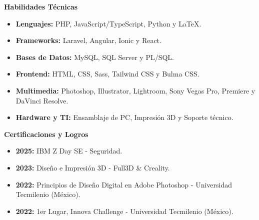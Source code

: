 \documentclass[9pt]{developercv}
\begin{document}
\begin{minipage}[t]{0.5\textwidth}
\vspace{3pt}
\textbf{Habilidades Técnicas}
\vspace{3pt}
\begin{itemize}
  \item \textbf {Lenguajes:} PHP, JavaScript/TypeScript, Python y LaTeX.
  \item \textbf {Frameworks:} Laravel, Angular, Ionic y React.
  \item \textbf {Bases de Datos:} MySQL, SQL Server y PL/SQL.
  \item \textbf {Frontend:} HTML, CSS, Sass, Tailwind CSS y Bulma CSS.
  \item \textbf {Multimedia:} Photoshop, Illustrator, Lightroom, Sony Vegas Pro, Premiere y DaVinci Resolve.
  \item \textbf {Hardware y TI:} Ensamblaje de PC, Impresión 3D y Soporte técnico.
\end{itemize}
\end{minipage}
\begin{minipage}[t]{0.5\textwidth}
\vspace{3pt}
\textbf{Certificaciones y Logros}
\begin{itemize}
  \item \textbf{2025:} IBM Z Day SE - Seguridad.
  \item \textbf{2023:} Diseño e Impresión 3D - Full3D \& Creality.
  \item \textbf{2022:} Principios de Diseño Digital en Adobe Photoshop  - Universidad Tecmilenio (México).
  \item \textbf{2022:} 1er Lugar, Innova Challenge - Universidad Tecmilenio (México). 
\end{itemize}
\end{minipage}
\end{document}
